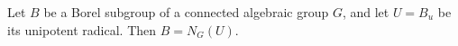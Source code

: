 Let $B$ be a Borel subgroup of a connected algebraic group $G$, and let $U = B_u$ be its unipotent radical. Then $B = N_G(U)$.
